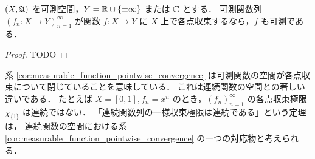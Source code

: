 \begin{corollary}\label{cor:measurable_function_pointwise_convergence}
    $(X,\mathfrak{A})$ を可測空間，$Y=\mathbb{R}\cup\{\pm\infty\}$ または $\mathbb{C}$ とする．
    可測関数列 $(f_n:X\to Y)_{n=1}^\infty$ が関数 $f:X\to Y$ に $X$ 上で各点収束するなら，$f$ も可測である．
\end{corollary}

\begin{proof}
    {\color{red} TODO}
\end{proof}

\begin{remark}
    系 \ref{cor:measurable_function_pointwise_convergence} は可測関数の空間が各点収束について閉じていることを意味している．
    これは連続関数の空間との著しい違いである．
    たとえば $X=[0,1],f_n=x^n$ のとき，$(f_n)_{n=1}^\infty$ の各点収束極限 $\chi_{\{1\}}$ は連続ではない．
    「連続関数列の一様収束極限は連続である」という定理は，
    連続関数の空間における系 \ref{cor:measurable_function_pointwise_convergence} の一つの対応物と考えられる．
\end{remark}
